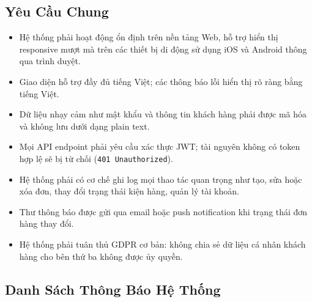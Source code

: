 \subsection{Yêu Cầu Chung}

\begin{itemize}
  \item Hệ thống phải hoạt động ổn định trên nền tảng Web, hỗ trợ hiển thị responsive mượt mà trên các thiết bị di động sử dụng iOS và Android thông qua trình duyệt.
  \item Giao diện hỗ trợ đầy đủ tiếng Việt; các thông báo lỗi hiển thị rõ ràng bằng tiếng Việt.
  \item Dữ liệu nhạy cảm như mật khẩu và thông tin khách hàng phải được mã hóa và không lưu dưới dạng plain text.
  \item Mọi API endpoint phải yêu cầu xác thực JWT; tài nguyên không có token hợp lệ sẽ bị từ chối (\texttt{401 Unauthorized}).
  \item Hệ thống phải có cơ chế ghi log mọi thao tác quan trọng như tạo, sửa hoặc xóa đơn, thay đổi trạng thái kiện hàng, quản lý tài khoản.
  \item Thư thông báo được gửi qua email hoặc push notification khi trạng thái đơn hàng thay đổi.
  \item Hệ thống phải tuân thủ GDPR cơ bản: không chia sẻ dữ liệu cá nhân khách hàng cho bên thứ ba không được ủy quyền.
\end{itemize}

\subsection{Danh Sách Thông Báo Hệ Thống}

